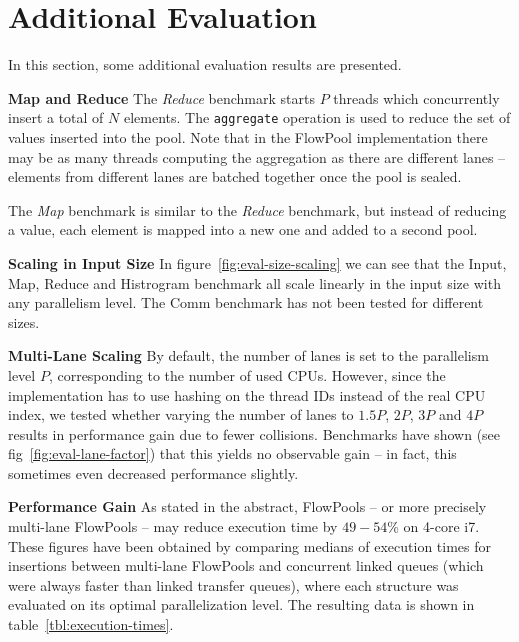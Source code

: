 \documentclass[runningheads,a4paper]{llncs}
\begin{document}
\section{Additional Evaluation}
\label{sec:add-eval}
In this section, some additional evaluation results are presented.

\textbf{Map and Reduce} The \textit{Reduce} benchmark starts $P$
threads which concurrently insert a total of $N$ elements. The
\verb=aggregate= operation is used to reduce the set of values
inserted into the pool. Note that in the FlowPool implementation there
may be as many threads computing the aggregation as there are
different lanes -- elements from different lanes are batched together
once the pool is sealed.

The \textit{Map} benchmark is similar to the \textit{Reduce}
benchmark, but instead of reducing a value, each element is mapped
into a new one and added to a second pool.

\textbf{Scaling in Input Size} In figure~\ref{fig:eval-size-scaling}
we can see that the Input, Map, Reduce and Histrogram benchmark all
scale linearly in the input size with any parallelism level. The Comm
benchmark has not been tested for different sizes. 

\textbf{Multi-Lane Scaling} By default, the number of lanes is set to
the parallelism level $P$, corresponding to the number of used
CPUs. However, since the implementation has to use hashing on the
thread IDs instead of the real CPU index, we tested whether varying
the number of lanes to $1.5 P$, $2P$, $3P$ and $4P$ results in
performance gain due to fewer collisions. Benchmarks have shown (see
fig~\ref{fig:eval-lane-factor}) that this yields no observable gain --
in fact, this sometimes even decreased performance slightly.

\textbf{Performance Gain} As stated in the abstract, FlowPools -- or
more precisely multi-lane FlowPools -- may reduce execution time by
$49 - 54\%$ on 4-core i7. These figures have been obtained by
comparing medians of execution times for insertions between multi-lane
FlowPools and concurrent linked queues (which were always faster than 
linked transfer queues), where each structure was evaluated on its
optimal parallelization level. The resulting data is shown in
table~\ref{tbl:execution-times}.

\end{document}
